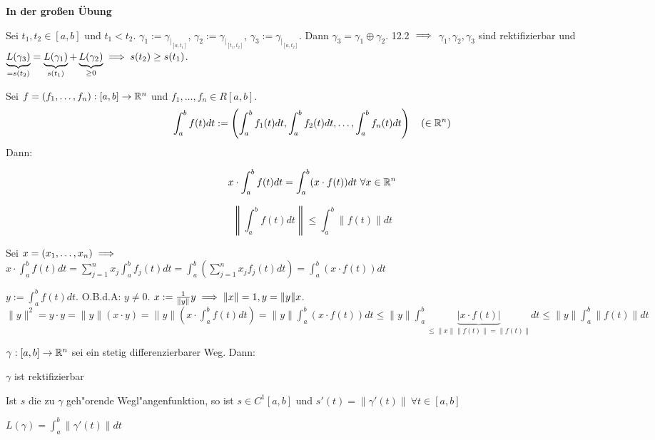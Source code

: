 \documentclass[a4paper,twoside,DIV15,BCOR12mm,chapterprefix=true,headings=twolinechapter]{scrbook}
\begin{document}
\begin{beweis}
\begin{liste}
\item \textbf{\color{red}In der großen Übung}
\item Sei $t_1, t_2 \in [a,b]$ und $t_1<t_2$. $\gamma_1:=\gamma_{|_{[a,t_1]}}$, $\gamma_2:=\gamma_{|_{[t_1,t_2]}}$, $\gamma_3:=\gamma_{|_{[a,t_2]}}$. Dann $\gamma_3 = \gamma_1 \oplus \gamma_2$. 12.2 $\implies$ $\gamma_1,\gamma_2,\gamma_3$ sind rektifizierbar und $\underbrace{L(\gamma_3)}_{=s(t_2)} = \underbrace{L(\gamma_1)}_{s(t_1)} + \underbrace{L(\gamma_2)}_{\ge 0} \implies s(t_2) \ge s(t_1)$.
\end{liste}
\end{beweis}

\begin{satz}
Sei $f=(f_1,\ldots,f_n):[a,b]\to\mathbb{R}^n$ und $f_1,\ldots,f_n\in R[a,b]$.
$$\int_a^bf(t)dt := \left(\int_a^bf_1(t)dt, \int_a^bf_2(t)dt,\ldots, \int_a^bf_n(t)dt\right) \quad (\in\mathbb{R}^n)$$
Dann: \begin{liste}
\item $$x\cdot \int_a^bf(t)dt = \int_a^b(x\cdot f(t))dt \ \forall x\in\mathbb{R}^n$$
\item $$\left\|\int_a^bf(t)dt\right\| \le \int_a^b\|f(t)\|dt$$
\end{liste}
\end{satz}

\begin{beweis}
\begin{liste}
\item Sei $x=(x_1,\ldots,x_n) \implies$\\ $x\cdot\int_a^b f(t)dt = \sum_{j=1}^n x_j\int_a^bf_j(t) dt = \int_a^b\left(\sum_{j=1}^n x_j f_j(t)dt\right) = \int_a^b \left(x\cdot f(t)\right) dt$
\item $y:=\int_a^bf(t)dt$. O.B.d.A: $y\ne 0$. $x:= \frac{1}{\|y\|} y \implies \|x\|=1, y=\|y\|x$. $\|y\|^2 = y\cdot y = \|y\|(x\cdot y) = \|y\|\left(x\cdot \int_a^bf(t)dt \right) = \|y\|\int_a^b\left(x\cdot f(t)\right) dt \le \|y\|\int_a^b\underbrace{|x \cdot f(t)|}_{\le\|x\|\|f(t)\| = \|f(t)\|} dt \le \|y\| \int_a^b\|f(t)\|dt$
\end{liste}
\end{beweis}


\begin{satz}
$\gamma:[a,b]\to\mathbb{R}^n$ sei ein stetig differenzierbarer Weg. Dann:
\begin{liste}
\item $\gamma$ ist rektifizierbar
\item Ist $s$ die zu $\gamma$ geh"orende Wegl"angenfunktion, so ist $s\in C^1[a,b]$ und $s'(t)=\|\gamma'(t)\|\ \forall t\in[a,b]$
\item $L(\gamma)=\int_a^b\|\gamma'(t)\|dt$
\end{liste}
\end{satz}
\end{document}
